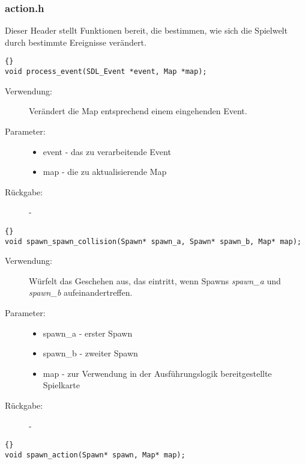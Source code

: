 \documentclass[11pt,a4paper,notitlepage]{report}
\begin{document}
	\newpage
	\subsubsection*{action.h}
	Dieser Header stellt Funktionen bereit, die bestimmen, wie sich die Spielwelt durch bestimmte Ereignisse verändert.

		\begin{lstlisting}[caption=process\_event]{}
void process_event(SDL_Event *event, Map *map);
		\end{lstlisting}
	\begin{description}
		\item[Verwendung:] Verändert die Map entsprechend einem eingehenden Event.
		\item[Parameter:] \hfill
		\begin{itemize}
			\item event - das zu verarbeitende Event
			\item map - die zu aktualisierende Map
		\end{itemize}
		\item[Rückgabe:] -
	\end{description}
	
	\begin{lstlisting}[caption=spawn\_spawn\_collision]{}
void spawn_spawn_collision(Spawn* spawn_a, Spawn* spawn_b, Map* map);
		\end{lstlisting}
		
	\begin{description}
		\item[Verwendung:] Würfelt das Geschehen aus, das eintritt, wenn Spawns \textit{spawn\_a} und \textit{spawn\_b} aufeinandertreffen.
		\item[Parameter:] \hfill
		\begin{itemize}
			\item spawn\_a - erster Spawn
			\item spawn\_b - zweiter Spawn
			\item map - zur Verwendung in der Ausführungslogik bereitgestellte Spielkarte
		\end{itemize}
		\item[Rückgabe:] -
	\end{description}
	
			\begin{lstlisting}[caption=spawn\_action]{}
void spawn_action(Spawn* spawn, Map* map);
		\end{lstlisting}
		
\end{document}
